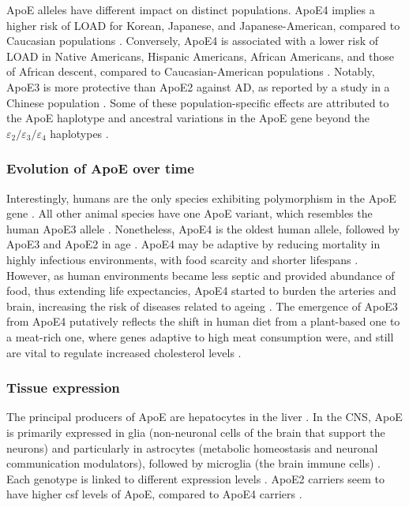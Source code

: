 \documentclass{amsart}
\begin{document}
ApoE alleles have different impact on distinct populations. ApoE4 implies a higher risk of LOAD for Korean, Japanese, and Japanese-American, compared to Caucasian populations \cite{Farrer1997EffectsMeta-analysis}. Conversely, ApoE4 is associated with a lower risk of LOAD in Native Americans, Hispanic Americans, African Americans, and those of African descent, compared to Caucasian-American populations \cite{Farrer1997EffectsMeta-analysis, Blue2019LocalHispanics, Suchy-Dicey2022APOEStudy, Rajabli2018AncestralPopulations, Naslavsky2022GlobalSample}. Notably, ApoE3 is more protective than ApoE2 against AD, as reported by a study in a Chinese population \cite{Chen2011ApolipoproteinDisease}. Some of these population-specific effects are attributed to the ApoE haplotype and ancestral variations in the ApoE gene beyond the $\varepsilon_2/\varepsilon_3/\varepsilon_4$ haplotypes \cite{Blue2019LocalHispanics, Rajabli2018AncestralPopulations}.

\subsubsection{Evolution of ApoE over time}
Interestingly, humans are the only species exhibiting polymorphism in the ApoE gene \cite{Yassine2020APOEDisease}. All other animal species have one ApoE variant, which resembles the human ApoE3 allele \cite{Hunsberger2019TheInterventions}. Nonetheless, ApoE4 is the oldest human allele, followed by ApoE3 and ApoE2 in age \cite{Yassine2020APOEDisease}. ApoE4 may be adaptive by reducing mortality in highly infectious environments, with food scarcity and shorter lifespans \cite{Trumble2017ApolipoproteinBurden}. However, as human environments became less septic and provided abundance of food, thus extending life expectancies,  ApoE4 started to burden the arteries and brain, increasing the risk of diseases related to ageing \cite{Yassine2020APOEDisease}. The emergence of ApoE3 from ApoE4 putatively reflects the shift in human diet from a plant-based one to a meat-rich one, where genes adaptive to high meat consumption were, and still are vital to regulate increased cholesterol levels \cite{Finch1999TheIsoforms}. 

\subsubsection{Tissue expression}
The principal producers of ApoE are hepatocytes in the liver \cite{Mahley2016CentralMetabolism}. In the CNS, ApoE is primarily expressed in glia (non-neuronal cells of the brain that support the neurons) and particularly in astrocytes (metabolic homeostasis and neuronal communication modulators), followed by microglia (the brain immune cells) \cite{Lanfranco2021ExpressionInflammation}. Each genotype is linked to different expression levels \cite{Husain2021APOETherapeutics}. ApoE2 carriers seem to have higher \acrfull{csf} levels of ApoE, compared to ApoE4 carriers \cite{Castellano2011HumanClearance, Cruchaga2012CerebrospinalDisease}. 
\end{document}
